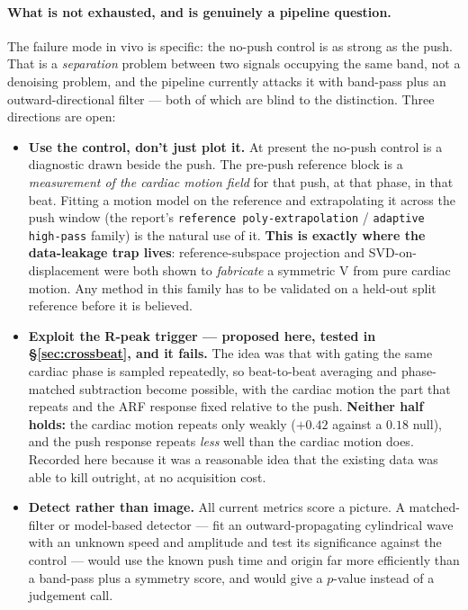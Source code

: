 \documentclass[11pt,a4paper]{article}
\newcommand{\caveat}[1]{\textcolor{orange!75!black}{\textbf{#1}}}
\newcommand{\bad}[1]{\textcolor{red!65!black}{\textbf{#1}}}
\begin{document}
\paragraph{What is not exhausted, and is genuinely a pipeline question.} The failure mode in vivo is
specific: the no-push control is as strong as the push. That is a \emph{separation} problem between
two signals occupying the same band, not a denoising problem, and the pipeline currently attacks it
with band-pass plus an outward-directional filter --- both of which are blind to the distinction.
Three directions are open:
\begin{itemize}
  \item \textbf{Use the control, don't just plot it.} At present the no-push control is a diagnostic
  drawn beside the push. The pre-push reference block is a \emph{measurement of the cardiac motion
  field} for that push, at that phase, in that beat. Fitting a motion model on the reference and
  extrapolating it across the push window (the report's \texttt{reference poly-extrapolation} /
  \texttt{adaptive high-pass} family) is the natural use of it. \caveat{This is exactly where the
  data-leakage trap lives}: reference-subspace projection and SVD-on-displacement were both shown to
  \emph{fabricate} a symmetric V from pure cardiac motion. Any method in this family has to be
  validated on a held-out split reference before it is believed.
  \item \caveat{Exploit the R-peak trigger --- proposed here, tested in \S\ref{sec:crossbeat}, and
  it fails.} The idea was that with gating the same cardiac phase is sampled repeatedly, so
  beat-to-beat averaging and phase-matched subtraction become possible, with the cardiac motion the
  part that repeats and the ARF response fixed relative to the push. \bad{Neither half holds:} the
  cardiac motion repeats only weakly ($+0.42$ against a $0.18$ null), and the push response repeats
  \emph{less} well than the cardiac motion does. Recorded here because it was a reasonable idea that
  the existing data was able to kill outright, at no acquisition cost.
  \item \textbf{Detect rather than image.} All current metrics score a picture. A matched-filter or
  model-based detector --- fit an outward-propagating cylindrical wave with an unknown speed and
  amplitude and test its significance against the control --- would use the known push time and
  origin far more efficiently than a band-pass plus a symmetry score, and would give a $p$-value
  instead of a judgement call.
\end{itemize}
\end{document}

